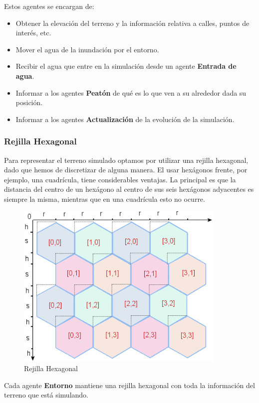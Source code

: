 Estos agentes se encargan de:

\begin{itemize}
 \item Obtener la elevación del terreno y la información relativa a calles,
puntos de interés, etc.
 \item Mover el agua de la inundación por el entorno.
 \item Recibir el agua que entre en la simulación desde un agente {\bf Entrada
de agua}.
 \item Informar a los agentes {\bf Peatón} de qué es lo que ven a su alrededor
dada su posición.
 \item Informar a los agentes {\bf Actualización} de la evolución de la
simulación.
\end{itemize}

\subsubsection*{Rejilla Hexagonal}

Para representar el terreno simulado optamos por utilizar una rejilla
hexagonal, dado que hemos de discretizar de alguna manera. El usar hexágonos
frente, por ejemplo, una cuadrícula, tiene considerables ventajas. La principal
es que la distancia del centro de un hexágono al centro de sus seis hexágonos
adyacentes es siempre la misma, mientras que en una cuadrícula esto no ocurre.

\begin{figure}
 \centering
 \includegraphics[width=100mm]{figuras/cap3/hexgrid.png}
 \caption{Rejilla Hexagonal}
\end{figure}

Cada agente {\bf Entorno} mantiene una rejilla hexagonal con toda la
información del terreno que está simulando.

